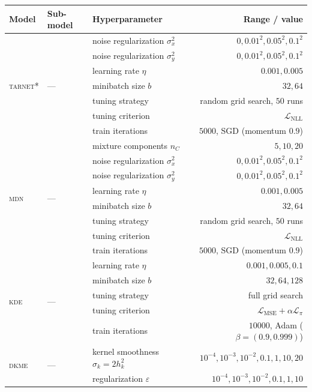 \documentclass[11pt]{article}
\theoremstyle{plain}
\theoremstyle{definition}
\theoremstyle{remark}
\begin{document}
\begin{table}[p]
\centering
\scriptsize
\begin{tabular}{@{}lllr@{}}
\toprule
Model & Sub-model & Hyperparameter & Range / value \\
\midrule
\multirow{7}{*}{\textsc{tarnet*}} & \multirow{7}{*}{---}
 & noise regularization $\sigma_x^2$ & $0,0.01^2,0.05^2,0.1^2$ \\
 & & noise regularization $\sigma_y^2$ & $0,0.01^2,0.05^2,0.1^2$ \\
 & & learning rate $\eta$ & $0.001,0.005$ \\
 & & minibatch size $b$ & $32,64$ \\
 & & tuning strategy & random grid search, $50$ runs \\
 & & tuning criterion & $\mathcal{L}_{\mathrm{NLL}}$ \\
 & & train iterations & $5000$, SGD (momentum $0.9$) \\
\midrule
\multirow{8}{*}{\textsc{mdn}} & \multirow{8}{*}{---}
 & mixture components $n_C$ & $5,10,20$ \\
 & & noise regularization $\sigma_x^2$ & $0,0.01^2,0.05^2,0.1^2$ \\
 & & noise regularization $\sigma_y^2$ & $0,0.01^2,0.05^2,0.1^2$ \\
 & & learning rate $\eta$ & $0.001,0.005$ \\
 & & minibatch size $b$ & $32,64$ \\
 & & tuning strategy & random grid search, $50$ runs \\
 & & tuning criterion & $\mathcal{L}_{\mathrm{NLL}}$ \\
 & & train iterations & $5000$, SGD (momentum $0.9$) \\
\midrule
\multirow{5}{*}{\textsc{kde}} & \multirow{5}{*}{---}
 & learning rate $\eta$ & $0.001,0.005,0.1$ \\
 & & minibatch size $b$ & $32,64,128$ \\
 & & tuning strategy & full grid search \\
 & & tuning criterion & $\mathcal{L}_{\mathrm{MSE}}+\alpha\mathcal{L}_\pi$ \\
 & & train iterations & $10000$, Adam ($\beta{=}(0.9,0.999)$) \\
\midrule
\multirow{3}{*}{\textsc{dkme}} & \multirow{3}{*}{---}
 & kernel smoothness $\sigma_k=2h_k^2$ & $10^{-4},10^{-3},10^{-2},0.1,1,10,20$ \\
 & & regularization $\varepsilon$ & $10^{-4},10^{-3},10^{-2},0.1,1,10$ \\

\end{tabular}
\end{table}
\end{document}
